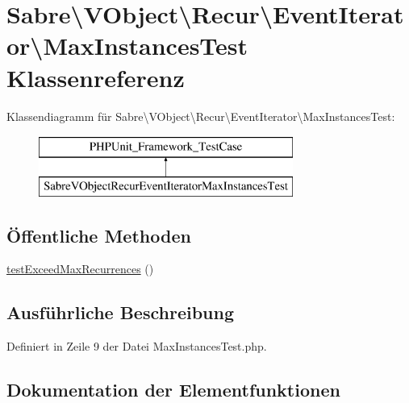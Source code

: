 \hypertarget{class_sabre_1_1_v_object_1_1_recur_1_1_event_iterator_1_1_max_instances_test}{}\section{Sabre\textbackslash{}V\+Object\textbackslash{}Recur\textbackslash{}Event\+Iterator\textbackslash{}Max\+Instances\+Test Klassenreferenz}
\label{class_sabre_1_1_v_object_1_1_recur_1_1_event_iterator_1_1_max_instances_test}
Klassendiagramm für Sabre\textbackslash{}V\+Object\textbackslash{}Recur\textbackslash{}Event\+Iterator\textbackslash{}Max\+Instances\+Test\+:\begin{figure}[H]
\begin{center}
\leavevmode
\includegraphics[height=2.000000cm]{class_sabre_1_1_v_object_1_1_recur_1_1_event_iterator_1_1_max_instances_test}
\end{center}
\end{figure}
\subsection*{Öffentliche Methoden}
\begin{DoxyCompactItemize}
\item 
\mbox{\hyperlink{class_sabre_1_1_v_object_1_1_recur_1_1_event_iterator_1_1_max_instances_test_abd5490290c1333da04fa7c20401b1c3b}{test\+Exceed\+Max\+Recurrences}} ()
\end{DoxyCompactItemize}


\subsection{Ausführliche Beschreibung}


Definiert in Zeile 9 der Datei Max\+Instances\+Test.\+php.



\subsection{Dokumentation der Elementfunktionen}
\mbox{\label{class_sabre_1_1_v_object_1_1_recur_1_1_event_iterator_1_1_max_instances_test_abd5490290c1333da04fa7c20401b1c3b}} 
